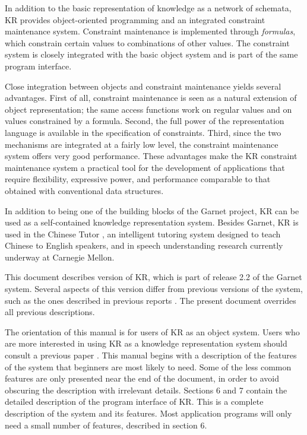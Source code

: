 In addition to the basic representation of knowledge as a network of
schemata, KR provides object-oriented programming and an integrated
constraint maintenance system.  Constraint maintenance is implemented
through {\it formulas}, which constrain certain values to combinations
of other values.  The constraint system is closely integrated with the
basic object system and is part of the same program interface.

Close integration between objects and constraint maintenance yields
several advantages.  First of all, constraint maintenance is seen as a
natural extension of object representation; the same access functions work
on regular values and on values constrained by a formula.  Second, the full
power of the representation language is available in the specification of
constraints.  Third, since the two mechanisms are integrated at a fairly
low level, the constraint maintenance system offers very good performance.
These advantages make the KR constraint maintenance system a
practical tool for the development of applications that require
flexibility, expressive power, and performance comparable to that obtained
with conventional data structures.

In addition to being one of the building blocks of the Garnet project, KR
can be used as a self-contained knowledge representation system.  Besides
Garnet, KR is used in the Chinese Tutor \cite{CHINESE-TUTOR}
\cite{CHINESE-TUTOR-SHANGHAI}, an intelligent tutoring system designed to
teach Chinese to English speakers, and in speech understanding research
\cite{MINDS} currently underway at Carnegie Mellon.

This document describes version \value{version} of KR, which is part of
release 2.2 of the Garnet system.  Several aspects of this version differ
from previous versions of the system, such as the ones described in
previous reports \cite{KRTR2} \cite{KR}.  The present document overrides
all previous descriptions.

The orientation of this manual is for users of KR as an object system.
Users who are more interested in using KR as a knowledge representation
system should consult a previous paper \cite{kr-ker}.  This manual begins
with a description of the features of the system that beginners are most
likely to need.  Some of the less common features are only presented near
the end of the document, in order to avoid obscuring the description with
irrelevant details.  Sections 6 and 7 contain the detailed description of
the program interface of KR.  This is a complete description of the system
and its features.  Most application programs will only need a small number
of features, described in section 6.





